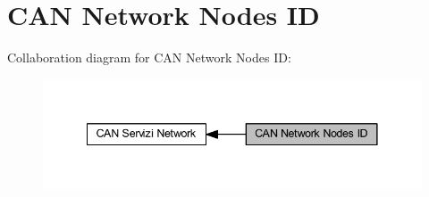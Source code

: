 \hypertarget{group___c_a_n___i_d}{}\section{C\+AN Network Nodes ID}
\label{group___c_a_n___i_d}
Collaboration diagram for C\+AN Network Nodes ID\+:\nopagebreak
\begin{figure}[H]
\begin{center}
\leavevmode
\includegraphics[width=341pt]{group___c_a_n___i_d}
\end{center}
\end{figure}
